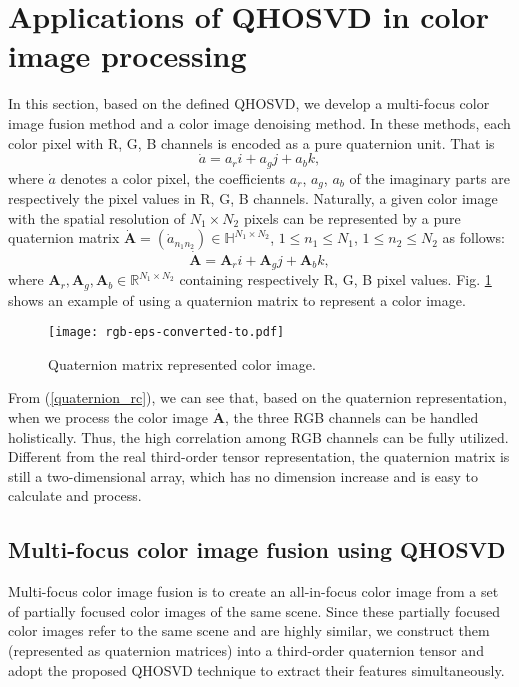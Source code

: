 \documentclass[journal]{IEEEtran}
\begin{document}
\section{Applications of QHOSVD in color image processing}
\label{app:qhosvd}
In this section, based on the defined QHOSVD, we develop a multi-focus color image fusion method and a color image denoising method. In these methods, each color pixel with R, G, B channels is encoded as a pure quaternion unit. That is
\begin{equation}
\dot{a}=a_{r}i+a_{g}j+a_{b}k,
\end{equation}
where $\dot{a}$ denotes a color pixel, the coefficients $a_{r}$, $a_{g}$, $a_{b}$ of the imaginary parts are respectively the pixel values in R, G, B channels. Naturally, a given color image with the spatial resolution of $N_{1}\times N_{2}$ pixels can be represented by a pure quaternion matrix $\dot{\mathbf{A}}=(\dot{a}_{n_{1}n_{2}})\in\mathbb{H}^{N_{1}\times N_{2}}$, $1\leq n_{1}\leq N_{1}$, $1\leq n_{2}\leq N_{2}$ as follows:
\begin{equation}
	\label{quaternion_rc}
\dot{\mathbf{A}}=\mathbf{A}_{r}i+\mathbf{A}_{g}j+\mathbf{A}_{b}k,
\end{equation}
where $\mathbf{A}_{r}, \mathbf{A}_{g}, \mathbf{A}_{b}\in\mathbb{R}^{N_{1}\times N_{2}}$ containing respectively R, G, B pixel values. Fig. \ref{rgb} shows an example of using a quaternion matrix to represent a color image.
\begin{figure}[htbp]
	\centering
	\texttt{[image: rgb-eps-converted-to.pdf]}
	\caption{Quaternion matrix represented color image.}
	\label{rgb}
\end{figure}

From (\ref{quaternion_rc}), we can see that, based on the quaternion representation, when we process the color image $\dot{\mathbf{A}}$, the three RGB channels can be handled holistically. Thus, the  high correlation among RGB  channels can be fully utilized. Different from the real third-order tensor representation, the quaternion matrix is still a two-dimensional array, which has no dimension increase and is easy to calculate and process.


\subsection{Multi-focus color image fusion using QHOSVD}
Multi-focus color image fusion is to create an all-in-focus color image from a set of partially focused color images of the same scene. Since these partially focused color images refer to the same scene and are highly similar, we construct them (represented as quaternion matrices) into a third-order quaternion tensor and adopt the proposed QHOSVD technique to extract their features simultaneously.
\end{document}
